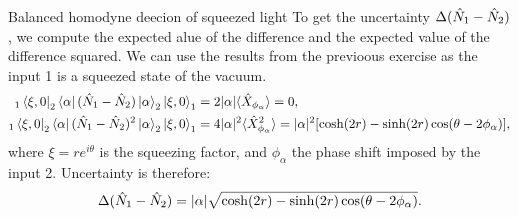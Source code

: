 \begin{example}{Balanced homodyne deecion of squeezed light}
    To get the uncertainty $\Delta(\hat{N}_1-\hat{N}_2)$, we compute the expected alue of the difference and the expected value of the difference squared.
    We can use the results from the previoous exercise as the input 1 is a squeezed state of the vacuum.
    \begin{align*}
    _1\left\langle\xi,0\right|_2\left\langle\alpha\right|(\hat{N}_1-\hat{N}_2)\left|\alpha\right\rangle_2\left|\xi,0\right\rangle_1&=2|\alpha|\langle\hat{X}_{\phi_\alpha}\rangle=0,\\
    _1\left\langle\xi,0\right|_2\left\langle\alpha\right|(\hat{N}_1-\hat{N}_2)^2\left|\alpha\right\rangle_2\left|\xi,0\right\rangle_1&=4|\alpha|^2\langle\hat{X}_{\phi_\alpha}^2\rangle=|\alpha|^2[\cosh(2r)-\sinh(2r)\cos(\theta-2\phi_\alpha)],
    \end{align*}
    where $\xi=re^{i\theta}$ is the squeezing factor, and $\phi_\alpha$ the phase shift imposed by the input 2. Uncertainty is therefore:
    \begin{align*}
    \Delta(\hat{N}_1-\hat{N}_2)=|\alpha|\sqrt{\cosh(2r)-\sinh(2r)\cos(\theta-2\phi_\alpha)}.
    \end{align*}
\end{example}